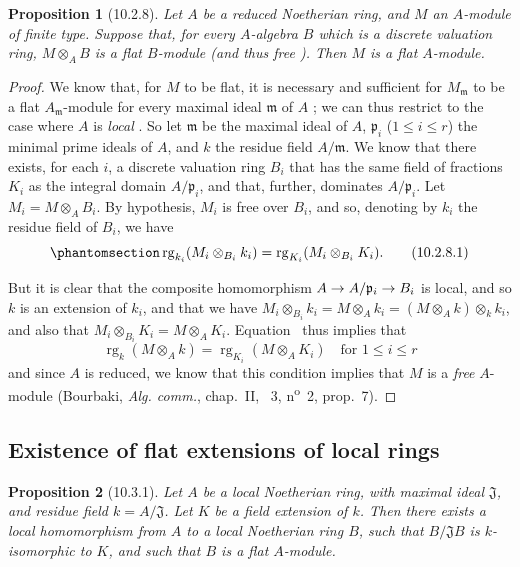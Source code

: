 \documentclass[oneside]{amsart}
\theoremstyle{ega-env-style}
\theoremstyle{ega-thm-env-style}
\newtheorem*{proposition}{Proposition}
\theoremstyle{ega-defn-env-style}
\def\leq{\leqslant}                 %
\def\rg{\operatorname{rg}}
\renewcommand{\to}{\mathchoice{\longrightarrow}{\rightarrow}{\rightarrow}{\rightarrow}}
\let\EGAOriginalLabel\label
\renewcommand{\label}[1]{\phantomsection\EGAOriginalLabel{#1}}
\begin{document}
\begin{proposition}[10.2.8]
\label{0.10.2.8}
Let $A$ be a reduced Noetherian ring, and $M$ an $A$-module of finite type.
Suppose that, for every $A$-algebra $B$ which is a discrete valuation ring, $M\otimes_A B$ is a flat $B$-module (and thus free ).
Then $M$ is a flat $A$-module.
\end{proposition}

\begin{proof}
We know that, for $M$ to be flat, it is necessary and sufficient for $M_\mathfrak{m}$ to be a flat $A_\mathfrak{m}$-module for every maximal ideal $\mathfrak{m}$ of $A$ ;
we can thus restrict to the case where $A$ is \emph{local} .
So let $\mathfrak{m}$ be the maximal ideal of $A$, $\mathfrak{p}_i$ ($1\leq i\leq r$) the minimal prime ideals of $A$, and $k$ the residue field $A/\mathfrak{m}$.
We know  that there exists, for each $i$, a discrete valuation ring $B_i$ that has the same field of fractions $K_i$ as the integral domain $A/\mathfrak{p}_i$, and that, further, dominates $A/\mathfrak{p}_i$.
Let $M_i=M\otimes_A B_i$.
By hypothesis, $M_i$ is free over $B_i$, and so, denoting by $k_i$ the residue field of $B_i$, we have
\[
\label{0.10.2.8.1}
  \rg_{k_i}(M_i\otimes_{B_i}k_i)=\rg_{K_i}(M_i\otimes_{B_i}K_i).
  \tag{10.2.8.1}
\]

But it is clear that the composite homomorphism $A\to A/\mathfrak{p}_i\to B_i$ is local, and so $k$ is an extension of $k_i$, and that we have $M_i\otimes_{B_i}k_i = M\otimes_A k_i = (M\otimes_A k)\otimes_k k_i$, and also that $M_i\otimes_{B_i}K_i = M\otimes_A K_i$.
Equation~ thus implies that
\[
  \rg_k(M\otimes_A k)=\rg_{K_i}(M\otimes_A K_i)\quad\mbox{for $1\leq i\leq r$}
\]
and since $A$ is reduced, we know that this condition implies that $M$ is a \emph{free} $A$-module (Bourbaki, \emph{Alg. comm.}, chap.~II, \textsection~3, n\textsuperscript{o}~2, prop.~7).
\end{proof}

\subsection{Existence of flat extensions of local rings}
\label{subsection:0.10.3}

\begin{proposition}[10.3.1]
\label{0.10.3.1}
Let $A$ be a local Noetherian ring, with maximal ideal $\mathfrak{J}$, and residue field $k=A/\mathfrak{J}$.
Let $K$ be a field extension of $k$.
Then there exists a local homomorphism from $A$ to a local Noetherian ring $B$, such that $B/\mathfrak{J}B$ is $k$-isomorphic to $K$, and such that $B$ is a flat $A$-module.
\end{proposition}
\end{document}
